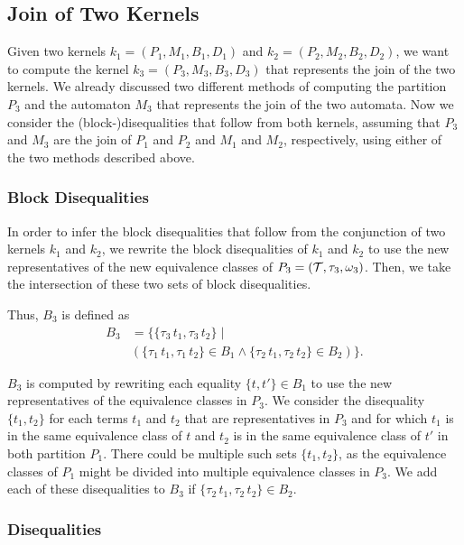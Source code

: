 \subsection{Join of Two Kernels}

Given two kernels $k_1 = (P_1, M_1,B_1, D_1)$ and $k_2 = (P_2, M_2,B_2, D_2)$, we want to compute the kernel $k_3 = (P_3, M_3,B_3, D_3)$ that represents the join of the two kernels.
We already discussed two different methods of computing the partition $P_3$ and the automaton $M_3$ that represents the join of the two automata.
Now we consider the (block-)disequalities that follow from both kernels,
assuming that $P_3$ and $M_3$ are the join of $P_1$ and $P_2$ and $M_1$ and $M_2$, respectively,
using either of the two methods described above.

\subsubsection{Block Disequalities}

In order to infer the block disequalities that follow from the conjunction of two kernels $k_1$ and $k_2$,
we rewrite the block disequalities of $k_1$ and $k_2$ to use the new representatives of the new equivalence classes of $P_3 = (\mathcal{T}, \tau_3, \omega_3)$.
Then, we take the intersection of these two sets of block disequalities.

Thus, $B_3$ is defined as
\[
\begin{array}{ll}
    B_3 & = \{\{\tau_3\,t_1, \tau_3\,t_2\}  \mid                                                \\
        & (\{\tau_1\,t_1, \tau_1\,t_2\} \in B_1 \land \{\tau_2\,t_1, \tau_2\,t_2\} \in B_2) \}.
\end{array}
\]

$B_3$ is computed by rewriting each equality $\{t, t'\} \in B_1$ to use the new representatives of the equivalence classes in $P_3$.
We consider the disequality $\{t_1, t_2\}$
for each terms $t_1$ and $t_2$ that are representatives in $P_3$ and for
which $t_1$ is in the same equivalence class of $t$ and $t_2$ is in the same equivalence class of $t'$ in both partition $P_1$.
There could be multiple such sets $\{t_1, t_2\}$,
as the equivalence classes of $P_1$ might be divided into multiple equivalence classes in $P_3$.
We add each of these disequalities to $B_3$ if $\{\tau_2\,t_1, \tau_2\,t_2\} \in B_2$.

\subsubsection{Disequalities}

